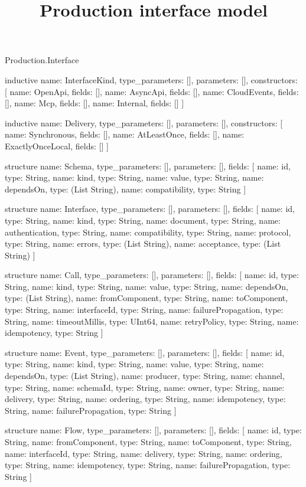 \begin{lexlean}{Production.Interface}
\title{Production interface model}
\begin{semanticmodule}
inductive{
  name: InterfaceKind,
  type_parameters: [],
  parameters: [],
  constructors: [
    {name: OpenApi, fields: []},
    {name: AsyncApi, fields: []},
    {name: CloudEvents, fields: []},
    {name: Mcp, fields: []},
    {name: Internal, fields: []}
  ]
}

inductive{
  name: Delivery,
  type_parameters: [],
  parameters: [],
  constructors: [
    {name: Synchronous, fields: []},
    {name: AtLeastOnce, fields: []},
    {name: ExactlyOnceLocal, fields: []}
  ]
}

structure{
  name: Schema,
  type_parameters: [],
  parameters: [],
  fields: [
    {name: id, type: String},
    {name: kind, type: String},
    {name: value, type: String},
    {name: dependsOn, type: (List String)},
    {name: compatibility, type: String}
  ]
}

structure{
  name: Interface,
  type_parameters: [],
  parameters: [],
  fields: [
    {name: id, type: String},
    {name: kind, type: String},
    {name: document, type: String},
    {name: authentication, type: String},
    {name: compatibility, type: String},
    {name: protocol, type: String},
    {name: errors, type: (List String)},
    {name: acceptance, type: (List String)}
  ]
}

structure{
  name: Call,
  type_parameters: [],
  parameters: [],
  fields: [
    {name: id, type: String},
    {name: kind, type: String},
    {name: value, type: String},
    {name: dependsOn, type: (List String)},
    {name: fromComponent, type: String},
    {name: toComponent, type: String},
    {name: interfaceId, type: String},
    {name: failurePropagation, type: String},
    {name: timeoutMillis, type: UInt64},
    {name: retryPolicy, type: String},
    {name: idempotency, type: String}
  ]
}

structure{
  name: Event,
  type_parameters: [],
  parameters: [],
  fields: [
    {name: id, type: String},
    {name: kind, type: String},
    {name: value, type: String},
    {name: dependsOn, type: (List String)},
    {name: producer, type: String},
    {name: channel, type: String},
    {name: schemaId, type: String},
    {name: owner, type: String},
    {name: delivery, type: String},
    {name: ordering, type: String},
    {name: idempotency, type: String},
    {name: failurePropagation, type: String}
  ]
}

structure{
  name: Flow,
  type_parameters: [],
  parameters: [],
  fields: [
    {name: id, type: String},
    {name: fromComponent, type: String},
    {name: toComponent, type: String},
    {name: interfaceId, type: String},
    {name: delivery, type: String},
    {name: ordering, type: String},
    {name: idempotency, type: String},
    {name: failurePropagation, type: String}
  ]
}
\end{semanticmodule}
\end{lexlean}

